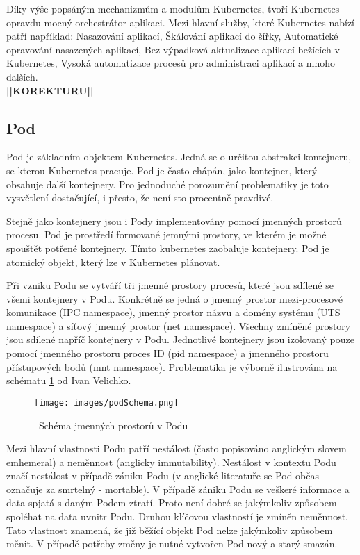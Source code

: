 Díky výše popsáným mechanizmům a modulům Kubernetes, tvoří Kubernetes opravdu mocný orchestrátor aplikaci. Mezi hlavní služby, které Kubernetes nabízí patří například: Nasazování aplikací, Škálování aplikací do šířky, Automatické opravování nasazených aplikací, Bez výpadková aktualizace aplikací bežících v Kubernetes, Vysoká automatizace procesů pro administraci aplikací a mnoho dalších.\cite{poulton_2022_the}\\
\textbf{||KOREKTURU||}
\subsection{Pod}
Pod je základním objektem Kubernetes. Jedná se o určitou abstrakci kontejneru, se kterou Kubernetes pracuje. Pod je často chápán, jako kontejner, který obsahuje další kontejnery. Pro jednoduché porozumění problematiky je toto vysvětlení dostačující, i přesto, že není sto procentně pravdivé.

Stejně jako kontejnery jsou i Pody implementovány pomocí jmenných prostorů procesu. Pod je prostředí formované jemnými prostory, ve kterém je možné spouštět potřené kontejnery. Tímto kubernetes zaobaluje kontejnery. Pod je atomický objekt, který lze v Kubernetes plánovat.

Při vzniku Podu se vytváří tři jmenné prostory procesů, které jsou sdílené se všemi kontejnery v Podu. Konkrétně se jedná o jmenný prostor mezi-procesové komunikace (IPC namespace), jmenný prostor názvu a domény systému (UTS namespace) a síťový jmenný prostor (net namespace). Všechny zmíněné prostory jsou sdílené napříč kontejnery v Podu. Jednotlivé kontejnery jsou izolovaný pouze pomocí jmenného prostoru proces ID (pid namespace)
a jmenného prostoru přístupových bodů (mnt namespace). Problematika je výborně ilustrována na schématu \ref{img:podSchema} od Ivan Velichko.
\begin{figure}[ht]
\centering
\texttt{[image: images/podSchema.png]}
\caption{~Schéma jmenných prostorů v Podu}\label{img:podSchema}
\cite{velichko_2021_kubernetes}
\end{figure}

Mezi hlavní vlastnosti Podu patří nestálost (často popisováno anglickým slovem emhemeral) a neměnnost (anglicky immutability). Nestálost v kontextu Podu značí nestálost v případě zániku Podu (v anglické literatuře se Pod občas označuje za smrtelný - mortable). V případě zániku Podu se veškeré informace a data spjatá s daným Podem ztratí. Proto není dobré se jakýmkoliv způsobem spoléhat na data uvnitr Podu. Druhou klíčovou vlastností je zmíněn neměnnost. Tato vlastnost znamená, že již běžící objekt Pod nelze jakýmkoliv způsobem měnit. V případě potřeby změny je nutné vytvořen Pod nový a starý smazán.\cite{poulton_2022_the}

